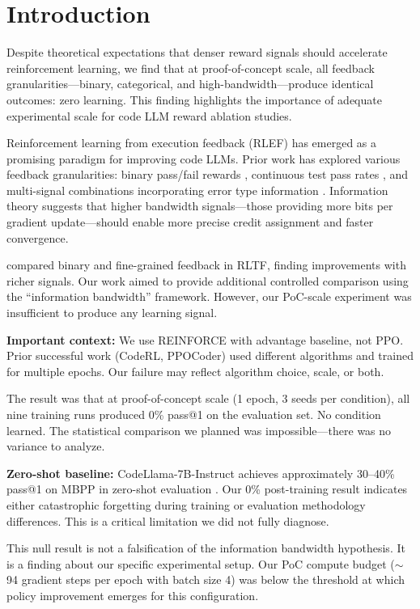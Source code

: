 \section{Introduction}

Despite theoretical expectations that denser reward signals should accelerate reinforcement learning, we find that at proof-of-concept scale, all feedback granularities---binary, categorical, and high-bandwidth---produce identical outcomes: zero learning. This finding highlights the importance of adequate experimental scale for code LLM reward ablation studies.

Reinforcement learning from execution feedback (RLEF) has emerged as a promising paradigm for improving code LLMs. Prior work has explored various feedback granularities: binary pass/fail rewards \citep{le2022coderl}, continuous test pass rates \citep{liu2023rltf}, and multi-signal combinations incorporating error type information \citep{shojaee2023ppocoder}. Information theory suggests that higher bandwidth signals---those providing more bits per gradient update---should enable more precise credit assignment and faster convergence.

\citet{liu2023rltf} compared binary and fine-grained feedback in RLTF, finding improvements with richer signals. Our work aimed to provide additional controlled comparison using the ``information bandwidth'' framework. However, our PoC-scale experiment was insufficient to produce any learning signal.

\textbf{Important context:} We use REINFORCE with advantage baseline, not PPO. Prior successful work (CodeRL, PPOCoder) used different algorithms and trained for multiple epochs. Our failure may reflect algorithm choice, scale, or both.

The result was that at proof-of-concept scale (1 epoch, 3 seeds per condition), all nine training runs produced 0\% pass@1 on the evaluation set. No condition learned. The statistical comparison we planned was impossible---there was no variance to analyze.

\textbf{Zero-shot baseline:} CodeLlama-7B-Instruct achieves approximately 30--40\% pass@1 on MBPP in zero-shot evaluation \citep{roziere2023codellama}. Our 0\% post-training result indicates either catastrophic forgetting during training or evaluation methodology differences. This is a critical limitation we did not fully diagnose.

This null result is not a falsification of the information bandwidth hypothesis. It is a finding about our specific experimental setup. Our PoC compute budget ($\sim$94 gradient steps per epoch with batch size 4) was below the threshold at which policy improvement emerges for this configuration.

